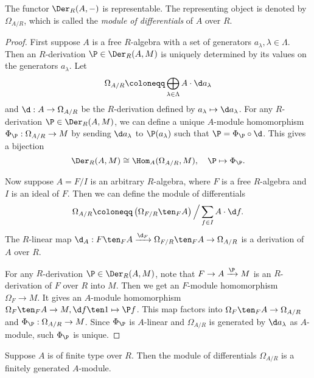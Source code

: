     \begin{proposition}\label{prop: module of differentials}
        The functor \(\Der_R(A, -)\) is representable.
        The representing object is denoted by \(\Omega_{A/R}\), which is called the \emph{module of differentials} of \(A\) over \(R\).
    \end{proposition}
    \begin{proof}
        First suppose \(A\) is a free \(R\)-algebra with a set of generators \(a_\lambda, \lambda \in \Lambda\).
        Then an \(R\)-derivation \(\P \in \Der_R(A, M)\) is uniquely determined by its values on the generators \(a_\lambda\).
        Let 
        \[ \Omega_{A/R} \coloneqq \bigoplus_{\lambda \in \Lambda} A \cdot \d a_\lambda\]
        and \(\d: A \to \Omega_{A/R}\) be the \(R\)-derivation defined by \(a_\lambda \mapsto \d a_\lambda\).
        For any \(R\)-derivation \(\P \in \Der_R(A, M)\), we can define a unique \(A\)-module homomorphism
        \(\Phi_\P: \Omega_{A/R} \to M\) by sending \(\d a_\lambda\) to \(\P(a_\lambda)\) such that \(\P = \Phi_\P \circ \d\).
        This gives a bijection
        \[
            \Der_R(A, M) \cong \Hom_A(\Omega_{A/R}, M), \quad \P \mapsto \Phi_\P.
        \] 

        Now suppose \(A = F/I\) is an arbitrary \(R\)-algebra, where \(F\) is a free \(R\)-algebra and \(I\) is an ideal of \(F\).
        Then we can define the module of differentials 
        \[ \Omega_{A/R} \coloneqq \left(\Omega_{F/R} \ten_F A \right) \Big/ \sum_{f \in I} A \cdot \d f. \]
        The \(R\)-linear map \(\d_A: F\ten_F A \xrightarrow{\d_F} \Omega_{F/R} \ten_F A \to \Omega_{A/R}\) is a derivation of \(A\) over \(R\).
        
        For any \(R\)-derivation \(\P \in \Der_R(A, M)\), note that \(F \to A \xrightarrow{\P} M\) is an \(R\)-derivation of \(F\) over \(R\) into \(M\).
        Then we get an \(F\)-module homomorphism \(\Omega_F \to M\).
        It gives an \(A\)-module homomorphism \(\Omega_F \ten_F A \to M, \d f \ten 1 \mapsto \P f\).
        This map factors into \(\Omega_F \ten_F A \to \Omega_{A/R}\) and \(\Phi_\P: \Omega_{A/R} \to M\).
        Since \(\Phi_\P\) is \(A\)-linear and \(\Omega_{A/R}\) is generated by \(\d a_\lambda\) as \(A\)-module, such \(\Phi_\P\) is unique.
    \end{proof}

    \begin{corollary}\label{cor: module of differentials is finite}
        Suppose \(A\) is of finite type over \(R\).
        Then the module of differentials \(\Omega_{A/R}\) is a finitely generated \(A\)-module.
    \end{corollary}
    
